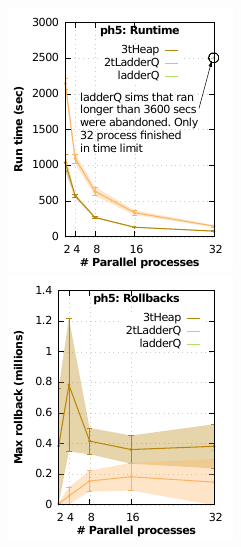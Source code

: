 \begin{figure}[H]\centering
\begin{minipage}{0.25\linewidth}
\includegraphics[width=\linewidth]{images/ph5_Delay_10_Evt_20_run_time}
\end{minipage}
\begin{minipage}{0.25\linewidth}
\includegraphics[width=\linewidth]{images/ph5_Delay_10_Evt_20_rollbacks}

\end{minipage}
\end{figure}
